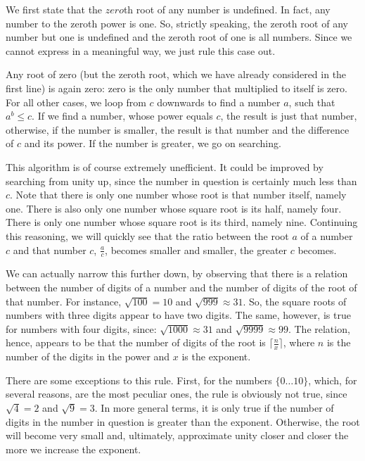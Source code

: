 \documentclass{scrreprt}
\newcommand{\Varid}[1]{\mathit{#1}}
\begin{document}
{We first state that the \ensuremath{\Varid{zero}}th root of any number
is undefined.
In fact, any number to the zeroth power is one.
So, strictly speaking, the zeroth root of any number
but one is undefined and
the zeroth root of one is all numbers.
Since we cannot express 
in a meaningful way, we just rule this case out.

Any root of zero (but the zeroth root,
which we have already considered in the first line)
is again zero: zero is the only number
that multiplied to itself is zero.
For all other cases,
we loop from $c$ downwards
to find a number $a$, such that $a^b \le c$.
If we find a number, whose power equals $c$,
the result is just that number,
otherwise, if the number is smaller,
the result is that number and 
the difference of $c$ and its power.
If the number is greater, we go on searching.

This algorithm is of course extremely unefficient.
It could be improved by searching from unity up,
since the number in question is certainly
much less than $c$. Note that there is only one
number whose root is that number itself,
namely one. There is also only one number
whose square root is its half, namely four.
There is only one number whose square root
is its third, namely nine.
Continuing this reasoning,
we will quickly see that 
the ratio between the root \ensuremath{\Varid{a}} of a number \ensuremath{\Varid{c}}
and that number \ensuremath{\Varid{c}}, $\frac{a}{c}$,
becomes smaller and smaller,
the greater \ensuremath{\Varid{c}} becomes.

We can actually narrow this further down,
by observing that there is a relation between
the number of digits of a number and the number
of digits of the root of that number.
For instance, $\sqrt{100} = 10$ and
$\sqrt{999} \approx 31$. 
So, the square roots of numbers with three digits
appear to have two digits.
The same, however, is true
for numbers with four digits, since:
$\sqrt{1000} \approx 31$ and
$\sqrt{9999} \approx 99$.
The relation, hence, appears to be
that the number of digits of the root is
$\lceil \frac{n}{x}\rceil$, where $n$ is the number of the digits 
in the power and $x$ is the exponent.

There are some exceptions to this rule.
First, for the numbers $\lbrace 0 \dots 10\rbrace$,
which, for several reasons, are the most peculiar ones,
the rule is obviously not true,
since $\sqrt{4} = 2$ and $\sqrt{9} = 3$.
In more general terms, 
it is only true if the number of digits in the number
in question is greater than the exponent.
Otherwise, the root will become very small
and, ultimately, approximate unity 
closer and closer the more we increase the exponent.

}
\end{document}
